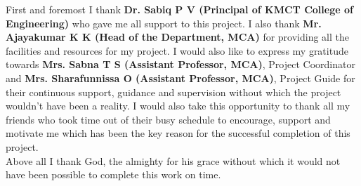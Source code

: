 \documentclass[a4paper,12pt,toc=flat]{report}
\begin{document}
	\hspace{12pt}First and foremost I thank {\bf Dr. Sabiq P V (Principal of KMCT College of Engineering)} who
	gave me all support to this project. I also thank {\bf Mr. Ajayakumar K K (Head of the Department,
		MCA)} for providing all the facilities and resources for my project. I would also like to express my
	gratitude towards {\bf Mrs. Sabna T S (Assistant Professor, MCA)}, Project Coordinator and  {\bf Mrs. Sharafunnissa O (Assistant Professor, MCA)}, Project Guide for their
	continuous support, guidance and supervision without which the project wouldn’t have been a
	reality.  I would also take this
	opportunity to thank all my friends who took time out of their busy schedule to encourage, support
	and motivate me which has been the key reason for the successful completion of this project.\\ 
	
	Above all I thank God, the almighty for his grace without which it would not have been
	possible to complete this work on time.	
	
	
	
	\pagebreak
	
	
	

	
\end{document}
